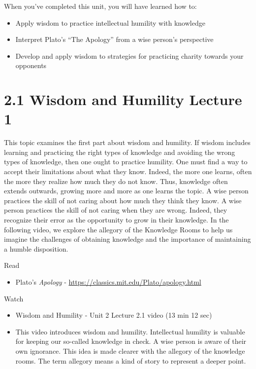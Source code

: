 \documentclass[
]{book}
\providecommand{\tightlist}{%
  \setlength{\itemsep}{0pt}\setlength{\parskip}{0pt}}
\begin{document}
When you've completed this unit, you will have learned how to:

\begin{itemize}
\tightlist
\item
  Apply wisdom to practice intellectual humility with knowledge
\item
  Interpret Plato's ``The Apology'' from a wise person's perspective
\item
  Develop and apply wisdom to strategies for practicing charity towards your opponents
\end{itemize}

\hypertarget{wisdom-and-humility-lecture-1}{%
\section*{2.1 Wisdom and Humility Lecture 1}\label{wisdom-and-humility-lecture-1}}

This topic examines the first part about wisdom and humility. If wisdom includes learning and practicing the right types of knowledge and avoiding the wrong types of knowledge, then one ought to practice humility. One must find a way to accept their limitations about what they know. Indeed, the more one learns, often the more they realize how much they do not know. Thus, knowledge often extends outwards, growing more and more as one learns the topic. A wise person practices the skill of not caring about how much they think they know. A wise person practices the skill of not caring when they are wrong. Indeed, they recognize their error as the opportunity to grow in their knowledge. In the following video, we explore the allegory of the Knowledge Rooms to help us imagine the challenges of obtaining knowledge and the importance of maintaining a humble disposition.

Read

\begin{itemize}
\tightlist
\item
  Plato's \emph{Apology} - \url{https://classics.mit.edu/Plato/apology.html}
\end{itemize}

Watch

\begin{itemize}
\tightlist
\item
  Wisdom and Humility - Unit 2 Lecture 2.1 video (13 min 12 sec)
\item
  This video introduces wisdom and humility. Intellectual humility is valuable for keeping our so-called knowledge in check. A wise person is aware of their own ignorance. This idea is made clearer with the allegory of the knowledge rooms. The term allegory means a kind of story to represent a deeper point.
\end{itemize}
\end{document}
